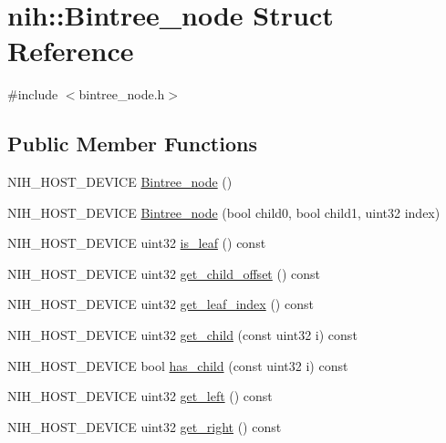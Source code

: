 \hypertarget{structnih_1_1_bintree__node}{
\section{nih\-:\-:\-Bintree\-\_\-node \-Struct \-Reference}
\label{structnih_1_1_bintree__node}
}


{\ttfamily \#include $<$bintree\-\_\-node.\-h$>$}

\subsection*{\-Public \-Member \-Functions}
\begin{DoxyCompactItemize}
\item 
\-N\-I\-H\-\_\-\-H\-O\-S\-T\-\_\-\-D\-E\-V\-I\-C\-E \hyperlink{structnih_1_1_bintree__node_a33079a0b0d308fe465370427b478db6a}{\-Bintree\-\_\-node} ()
\item 
\-N\-I\-H\-\_\-\-H\-O\-S\-T\-\_\-\-D\-E\-V\-I\-C\-E \hyperlink{structnih_1_1_bintree__node_a370062edc3fc1ded73af4955a42cf027}{\-Bintree\-\_\-node} (bool child0, bool child1, uint32 index)
\item 
\-N\-I\-H\-\_\-\-H\-O\-S\-T\-\_\-\-D\-E\-V\-I\-C\-E uint32 \hyperlink{structnih_1_1_bintree__node_af4b179818797ff734098a088f6365a2e}{is\-\_\-leaf} () const 
\item 
\-N\-I\-H\-\_\-\-H\-O\-S\-T\-\_\-\-D\-E\-V\-I\-C\-E uint32 \hyperlink{structnih_1_1_bintree__node_a5316c0c669435ebb119ff2be7b39f5a6}{get\-\_\-child\-\_\-offset} () const 
\item 
\-N\-I\-H\-\_\-\-H\-O\-S\-T\-\_\-\-D\-E\-V\-I\-C\-E uint32 \hyperlink{structnih_1_1_bintree__node_aa67980d0e9f1ccae46bf3c9741539abe}{get\-\_\-leaf\-\_\-index} () const 
\item 
\-N\-I\-H\-\_\-\-H\-O\-S\-T\-\_\-\-D\-E\-V\-I\-C\-E uint32 \hyperlink{structnih_1_1_bintree__node_a8cad70c2ebcbe6cc9f339e751d9a38ba}{get\-\_\-child} (const uint32 i) const 
\item 
\-N\-I\-H\-\_\-\-H\-O\-S\-T\-\_\-\-D\-E\-V\-I\-C\-E bool \hyperlink{structnih_1_1_bintree__node_a471bf83000ef72113a033539e19bf20b}{has\-\_\-child} (const uint32 i) const 
\item 
\-N\-I\-H\-\_\-\-H\-O\-S\-T\-\_\-\-D\-E\-V\-I\-C\-E uint32 \hyperlink{structnih_1_1_bintree__node_ac4859cefd9b6e3e3a27f1e850d1a4ad3}{get\-\_\-left} () const 
\item 
\-N\-I\-H\-\_\-\-H\-O\-S\-T\-\_\-\-D\-E\-V\-I\-C\-E uint32 \hyperlink{structnih_1_1_bintree__node_a2dd584ee8b3e54ff2488f66feb614fa5}{get\-\_\-right} () const 
\end{DoxyCompactItemize}
